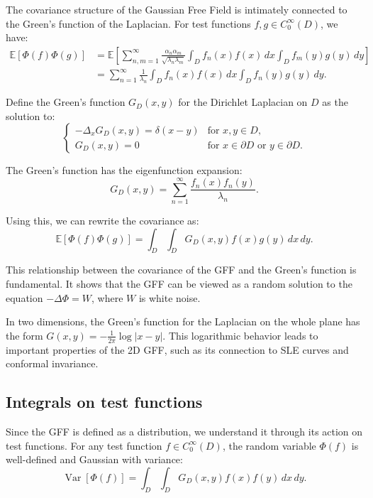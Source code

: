 \documentclass[letterpaper,11pt,oneside,reqno]{article}
\numberwithin{equation}{section}
\theoremstyle{definition}
\begin{document}
The covariance structure of the Gaussian Free Field is intimately connected to the Green's function of the Laplacian. For test functions $f, g \in C_0^{\infty}(D)$, we have:
\begin{align}
    \mathbb{E}[\Phi(f) \Phi(g)] &= \mathbb{E}\left[\sum_{n,m=1}^{\infty} \frac{\alpha_n \alpha_m}{\sqrt{\lambda_n \lambda_m}} \int_D f_n(x) f(x) \, dx \int_D f_m(y) g(y) \, dy\right] \\
    &= \sum_{n=1}^{\infty} \frac{1}{\lambda_n} \int_D f_n(x) f(x) \, dx \int_D f_n(y) g(y) \, dy.
\end{align}

Define the Green's function $G_D(x, y)$ for the Dirichlet Laplacian on $D$ as the solution to:
\begin{equation}
    \begin{cases}
        -\Delta_x G_D(x, y) = \delta(x - y) & \text{for } x, y \in D, \\
        G_D(x, y) = 0 & \text{for } x \in \partial D \text{ or } y \in \partial D.
    \end{cases}
\end{equation}

The Green's function has the eigenfunction expansion:
\begin{equation}
    G_D(x, y) = \sum_{n=1}^{\infty} \frac{f_n(x) f_n(y)}{\lambda_n}.
\end{equation}

Using this, we can rewrite the covariance as:
\begin{equation}
    \mathbb{E}[\Phi(f) \Phi(g)] = \int_D \int_D G_D(x, y) f(x) g(y) \, dx \, dy.
\end{equation}

This relationship between the covariance of the GFF and the Green's function is fundamental. It shows that the GFF can be viewed as a random solution to the equation $-\Delta \Phi = W$, where $W$ is white noise.

In two dimensions, the Green's function for the Laplacian on the whole plane has the form $G(x, y) = -\frac{1}{2\pi} \log|x - y|$. This logarithmic behavior leads to important properties of the 2D GFF, such as its connection to SLE curves and conformal invariance.

\subsection{Integrals on test functions}

Since the GFF is defined as a distribution, we understand it through its action on test functions. For any test function $f \in C_0^{\infty}(D)$, the random variable $\Phi(f)$ is well-defined and Gaussian with variance:
\begin{equation}
    \operatorname{Var}[\Phi(f)] = \int_D \int_D G_D(x, y) f(x) f(y) \, dx \, dy.
\end{equation}
\end{document}
